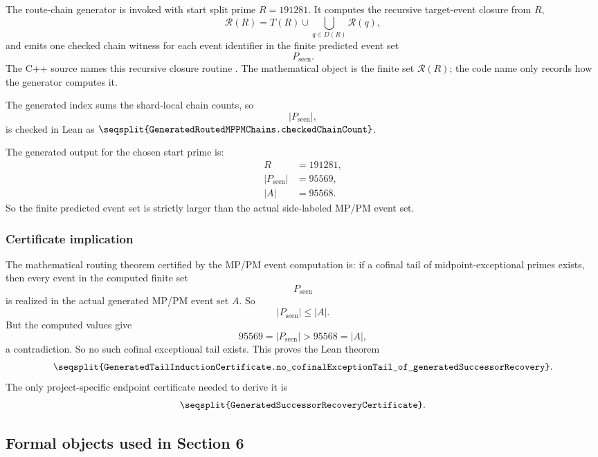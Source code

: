 \documentclass[11pt]{article}
\newcommand{\Lean}[1]{\texttt{\seqsplit{#1}}}
\newcommand{\Code}[1]{\texttt{\seqsplit{#1}}}
\begin{document}
The route-chain generator is invoked with start split prime \(R=191281\).  It
computes the recursive target-event closure from \(R\),
\[
  \mathcal R(R)=T(R)\cup\bigcup_{q\in D(R)}\mathcal R(q),
\]
and emits one checked chain witness for each event identifier in the finite
predicted event set
\[
  P_{\operatorname{seen}}.
\]
The C++ source names this recursive closure routine
\Code{reachable\_events(R)}.  The mathematical object is the finite set
\(\mathcal R(R)\); the code name only records how the generator computes it.

The generated index sums the shard-local chain counts, so
\[
  |P_{\operatorname{seen}}|,
\]
is checked in Lean as \(\Lean{GeneratedRoutedMPPMChains.checkedChainCount}\).

The generated output for the chosen start prime is:
\[
\begin{aligned}
  R&=191281,\\
  |P_{\operatorname{seen}}|&=95569,\\
  |A|&=95568.
\end{aligned}
\]
So the finite predicted event set is strictly larger than the actual
side-labeled MP/PM event set.

\subsubsection{Certificate implication}

The mathematical routing theorem certified by the MP/PM event computation is:
if a cofinal tail of midpoint-exceptional primes exists, then every event in
the computed finite set
\[
  P_{\operatorname{seen}}
\]
is realized in the actual generated MP/PM event set \(A\).
So
\[
  |P_{\operatorname{seen}}|\le |A|.
\]
But the computed values give
\[
  95569=|P_{\operatorname{seen}}|>95568=|A|,
\]
a contradiction.  So no such cofinal exceptional tail exists.  This proves the
Lean theorem
\[
  \Lean{GeneratedTailInductionCertificate.no\_cofinalExceptionTail\_of\_generatedSuccessorRecovery}.
\]
The only project-specific endpoint certificate needed to derive it is
\[
  \Lean{GeneratedSuccessorRecoveryCertificate}.
\]

\subsection{Formal objects used in Section 6}
\end{document}
